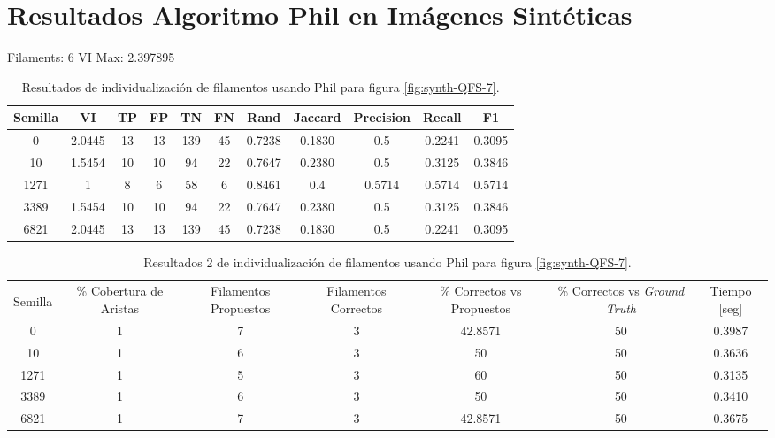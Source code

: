 \label{chap:apendice}

\section{Resultados Algoritmo Phil en Im\'agenes Sint\'eticas}

Filaments: 6	VI Max: 2.397895
\begin{table}[h]
    \centering
    \begin{tabular}{|c|c|c|c|c|c|c|c|c|c|c|}
    \hline
        Semilla & VI & TP & FP &TN &FN & Rand	& Jaccard &	Precision &	Recall &	F1 \\ \hline 
        0    & 2.0445 & 13 & 13 & 139 & 45 & 0.7238 & 0.1830 & 0.5 & 0.2241 & 0.3095\\
        10   & 1.5454 & 10 & 10 & 94  & 22 & 0.7647 & 0.2380 & 0.5 & 0.3125 & 0.3846\\
        1271 & 1 & 8  & 6  & 58  & 6  & 0.8461 & 0.4 & 0.5714 & 0.5714 & 0.5714\\
        3389 & 1.5454 & 10 & 10 & 94  & 22 & 0.7647 & 0.2380 & 0.5 & 0.3125 & 0.3846\\
        6821 & 2.0445 & 13 & 13 & 139 & 45 & 0.7238 & 0.1830 & 0.5  & 0.2241 & 0.3095\\
        \hline
    \end{tabular}
    \caption{Resultados de individualizaci\'on de filamentos usando Phil para figura \ref{fig:synth-QFS-7}.}
    \label{tab:Synth-QuantitativeIFS-Fig7DetailedResults1}
\end{table}

\begin{table}[h]
    \centering
    \begin{tabular}{|c|c|c|c|c|c|c|}
    \hline
         & \multirow{4}{2cm}{\centering \% Cobertura de Aristas} & \multirow{4}{2cm}{Filamentos Propuestos} & \multirow{4}{2cm}{Filamentos Correctos} & \multirow{4}{2.5cm}{\% Correctos vs Propuestos} & \multirow{4}{2.5cm}{\centering \% Correctos vs {\it Ground Truth}} & \multirow{4}{1.2cm}{\centering Tiempo [seg]} \\
         &  &  &  & & &  \\
        Semilla &  &  &  & & &  \\
        &  &  &  & & &  \\ \hline 
        0 & 1 & 7 & 3 & 42.8571 & 50 & 0.3987\\
        10 & 1 & 6 & 3 & 50 & 50 & 0.3636\\
        1271 & 1 & 5 & 3 & 60 & 50 & 0.3135\\
        3389 & 1 & 6 & 3 & 50 & 50 & 0.3410\\
        6821 & 1 & 7 & 3 & 42.8571 & 50 & 0.3675\\
        \hline
    \end{tabular}
    \caption{Resultados 2 de individualizaci\'on de filamentos usando Phil para figura \ref{fig:synth-QFS-7}.}
    \label{tab:Synth-QuantitativeIFS-Fig7DetailedResults2}
\end{table}

